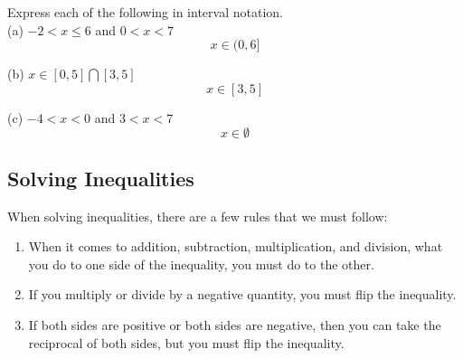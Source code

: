 \begin{exercise}\nonumber
	Express each of the following in interval notation. \\

	(a) $ -2 < x \le 6 $ and $ 0 < x < 7 $ \\
	$$
		x \in (0, 6]
	$$

	(b) $ x \in [0, 5] \bigcap [3, 5] $ \\
	$$
		x \in [3, 5]
	$$

	(c) $ -4 < x < 0 $ and $ 3 < x < 7 $ \\
	$$
		x \in \emptyset
	$$
\end{exercise}

\subsection{Solving Inequalities}

When solving inequalities, there are a few rules that we must follow: \\

\begin{enumerate}
	\item
	      When it comes to addition, subtraction, multiplication, and division, what you do to one side of the inequality, you must do to the other. \\

	\item
	      If you multiply or divide by a negative quantity, you must flip the inequality. \\

	\item
	      If both sides are positive or both sides are negative, then you can take the reciprocal of both sides, but you must flip the inequality. \\
\end{enumerate}

